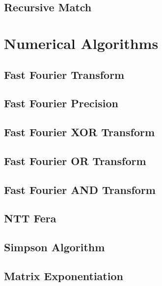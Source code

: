 \subsection{Recursive Match}
\raggedbottom
\hrulefill

\section{Numerical Algorithms}
\subsection{Fast Fourier Transform}
\raggedbottom
\hrulefill
\subsection{Fast Fourier Precision}
\raggedbottom
\hrulefill
\subsection{Fast Fourier XOR Transform}
\raggedbottom
\hrulefill
\subsection{Fast Fourier OR Transform}
\raggedbottom
\hrulefill
\subsection{Fast Fourier AND Transform}
\raggedbottom
\hrulefill
\subsection{NTT Fera}
\raggedbottom
\hrulefill
\subsection{Simpson Algorithm}
\raggedbottom
\hrulefill
\subsection{Matrix Exponentiation}
\raggedbottom
\hrulefill
